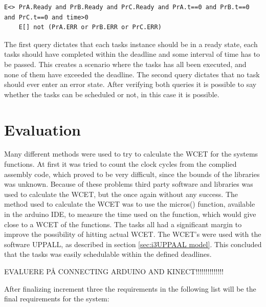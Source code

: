 \begin{lstlisting}[caption={Queries for UPPAAL}, label={QueriesAppendix}]
	E<> PrA.Ready and PrB.Ready and PrC.Ready and PrA.t==0 and PrB.t==0 and PrC.t==0 and time>0
	E[] not (PrA.ERR or PrB.ERR or PrC.ERR)
\end{lstlisting}

The first query dictates that each tasks instance should be in a ready state, each tasks should have completed within the deadline and some interval of time has to be passed. This creates a scenario where the tasks has all been executed, and none of them have exceeded the deadline.
The second query dictates that no task should ever enter an error state.
After verifying both queries it is possible to say whether the tasks can be scheduled or not, in this case it is possible.

\section{Evaluation}
\label{sec:i3Evaluation}
Many different methods were used to try to calculate the WCET for the systems functions. At first it was tried to count the clock cycles from the complied assembly code, which proved to be very difficult, since the bounds of the libraries was unknown. Because of these problems third party software and libraries was used to calculate the WCET, but the once again without any success. The method used to calculate the WCET was to use the micros() function, available in the arduino IDE, to measure the time used on the function, which would give close to a WCET of the functions. The tasks all had a significant margin to improve the possibility of hitting actual WCET. \newline
The WCET's were used with the software UPPALL, as described in section \ref{sec:i3UPPAAL model}. This concluded that the tasks was easily schedulable within the defined deadlines.

EVALUERE PÅ CONNECTING ARDUINO AND KINECT!!!!!!!!!!!!!!

After finalizing increment three the requirements in the following list will be the final requirements for the system:

